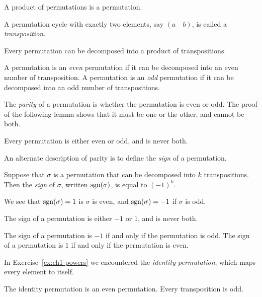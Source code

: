 \begin{lemma}
    A product of permutations is a permutation.
\end{lemma}

\begin{definition}[(Transposition)]
    A permutation cycle with exactly two elements, say \((a\quad b)\), is called a \textit{transposition}.
\end{definition}

\begin{lemma}
    Every permutation can be decomposed into a product of transpositions.
\end{lemma}

\begin{definition}
    A permutation is an \textit{even} permutation if it can be decomposed into an even number of transposition. A permutation is an \textit{odd} permutation if it can be decomposed into an odd number of transpositions.
\end{definition}

The \textit{parity} of a permutation is whether the permutation is even or odd. The proof of the following lemma shows that it must be one or the other, and cannot be both.

\begin{lemma}
    Every permutation is either even or odd, and is never both.
\end{lemma}

An alternate description of parity is to define the \textit{sign} of a permutation.

\begin{definition}
    Suppose that \(\sigma\) is a permutation that can be decomposed into \(k\) transpositions. Then the \textit{sign} of \(\sigma\), written \(\mathrm{sgn}(\sigma)\), is equal to \((-1)^{k}\).
\end{definition}

We see that \(\mathrm{sgn}(\sigma) = 1\) is \(\sigma\) is even, and \(\mathrm{sgn}(\sigma) = -1\) if \(\sigma\) is odd.

\begin{lemma}
    The sign of a permutation is either \(-1\) or \(1\), and is never both.
\end{lemma}

\begin{lemma}
    The sign of a permutation is \(-1\) if and only if the permutation is odd. The sign of a permutation is \(1\) if and only if the permutation is even.
\end{lemma}

In Exercise~\ref{ex:ch1-powers} we encountered the \textit{identity permutation}, which maps every element to itself.

\begin{lemma}
    The identity permutation is an even permutation. Every transposition is odd.
\end{lemma}
